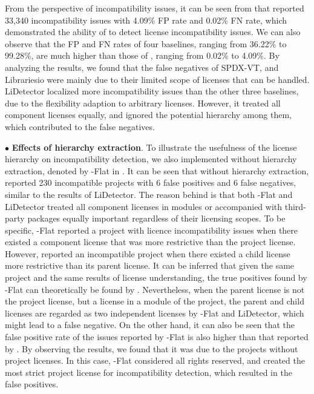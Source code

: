 From the perspective of incompatibility issues, it can be seen from  that \tool reported 33,340 incompatibility issues with 4.09\% FP rate and 0.02\% FN rate, which demonstrated the ability of \tool to detect license incompatibility issues. We can also observe that the FP and FN rates of four baselines, ranging from 36.22\% to 99.28\%, are much higher than those of \tool, ranging from 0.02\% to 4.09\%. By analyzing the results, we found that the false negatives of SPDX-VT, and Librariesio were mainly due to their limited scope of licenses that can be handled. LiDetector localized more incompatibility issues than the other three baselines, due to the flexibility adaption to arbitrary licenses. However, it treated all component licenses equally, and ignored the potential hierarchy among them, which contributed to the false negatives. 



\noindent $\bullet$ \textbf{Effects of hierarchy extraction}. 
To illustrate the usefulness of the license hierarchy on incompatibility detection, we also implemented \tool without hierarchy extraction, denoted by \tool-Flat in . It can be seen that without hierarchy extraction, \tool reported 230 incompatible projects with 6 false positives and 6 false negatives,
similar to the results of LiDetector.
The reason behind is that both \tool-Flat and LiDetector treated all component licenses in modules or accompanied with third-party packages equally important regardless of their licensing scopes. To be specific, \tool-Flat reported a project with licence incompatibility issues when there existed a component license that was more {restrictive} than the project license. However, \tool reported an incompatible project when there existed a child license more restrictive than its parent license. It can be inferred that given the same project and the same results of license understanding, the true positives found by \tool-Flat can theoretically be found by \tool. Nevertheless, when the parent license is not the project license, but a license in a module of the project, the parent and child licenses are regarded as two independent licenses by \tool-Flat and LiDetector, which might lead to a false negative. On the other hand, it can also be seen that the false positive rate of the issues reported by \tool-Flat is also higher than that reported by \tool. By observing the results, we found that it was due to the projects without project licenses. In this case, \tool-Flat considered all rights reserved, and created the most strict project license for incompatibility detection, which resulted in the false positives. %

